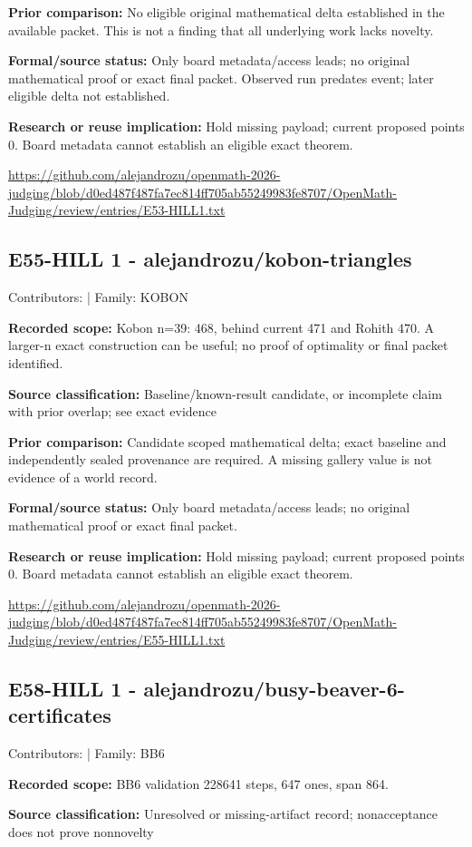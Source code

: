 \documentclass[11pt,a4paper]{article}
\begin{document}
\textbf{Prior comparison:} No eligible original mathematical delta established in the available packet. This is not a finding that all underlying work lacks novelty.

\textbf{Formal/source status:} Only board metadata/access leads; no original mathematical proof or exact final packet. Observed run predates event; later eligible delta not established.

\textbf{Research or reuse implication:} Hold missing payload; current proposed points 0. Board metadata cannot establish an eligible exact theorem.

{\small \url{https://github.com/alejandrozu/openmath-2026-judging/blob/d0ed487f487fa7ec814ff705ab55249983fe8707/OpenMath-Judging/review/entries/E53-HILL1.txt}\par}

\begin{samepage}
\subsection{E55-HILL 1  -  alejandrozu/kobon-triangles}
{\small Contributors:  | Family: KOBON\par}

\textbf{Recorded scope:} Kobon n=39: 468, behind current 471 and Rohith 470. A larger-n exact construction can be useful; no proof of optimality or final packet identified.

\end{samepage}
\textbf{Source classification:} Baseline/known-result candidate, or incomplete claim with prior overlap; see exact evidence

\textbf{Prior comparison:} Candidate scoped mathematical delta; exact baseline and independently sealed provenance are required. A missing gallery value is not evidence of a world record.

\textbf{Formal/source status:} Only board metadata/access leads; no original mathematical proof or exact final packet. 

\textbf{Research or reuse implication:} Hold missing payload; current proposed points 0. Board metadata cannot establish an eligible exact theorem.

{\small \url{https://github.com/alejandrozu/openmath-2026-judging/blob/d0ed487f487fa7ec814ff705ab55249983fe8707/OpenMath-Judging/review/entries/E55-HILL1.txt}\par}

\begin{samepage}
\subsection{E58-HILL 1  -  alejandrozu/busy-beaver-6-certificates}
{\small Contributors:  | Family: BB6\par}

\textbf{Recorded scope:} BB6 validation 228641 steps, 647 ones, span 864.

\end{samepage}
\textbf{Source classification:} Unresolved or missing-artifact record; nonacceptance does not prove nonnovelty
\end{document}
